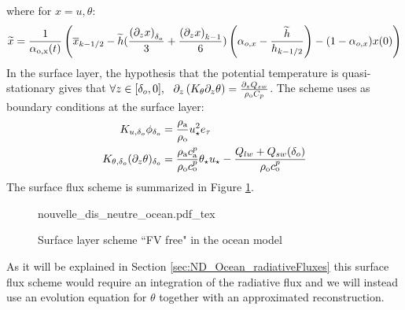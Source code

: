where for $x=u,\theta$:
\begin{equation}
	\widetilde{x} = \frac{1}{\alpha_{\rm o, x}(t)}
	\left(
	\overline{x}_{k-1/2} -
	\widetilde{h}(\frac{{(\partial_z x)}_{\delta_o}}{3} +
	\frac{{(\partial_z x)}_{k-1}}{6})
	\left(\alpha_{o, x}-\frac{\widetilde{h}}{h_{k-1/2}}\right)
	 - (1 - \alpha_{o, x})x(0)
	\right)
\end{equation}
In the surface layer, the hypothesis that the potential
temperature is quasi-stationary gives that
$\forall z \in [\delta_o, 0], ~~
\partial_z \left(K_\theta \partial_z \theta \right)
= \frac{\partial_z Q_{sw}}{\rho_{\rm o} C_p}$.
The scheme uses as boundary conditions at the surface layer:
\begin{equation}
\label{eq:ND_Ocean_boundaryConditionFVfree}
\begin{aligned}
	K_{u,\delta_o} \phi_{\delta_o} &= \frac{\rho_{\rm a}}
	{\rho_{\rm o}}
	u_\star^2 e_\tau
	\\
	K_{\theta, \delta_o} (\partial_z \theta)_{\delta_o} &= 
	\frac{\rho_{\rm a} c_{\rm a}^p}{\rho_{\rm o} c_{\rm o}^p}
	\theta_\star u_\star - \frac{Q_{lw} + Q_{sw}(\delta_{o})}{\rho_{\rm o} c_{\rm o}^p}
  \end{aligned}
\end{equation}
The surface flux scheme is summarized in Figure
\ref{fig:ND_Ocean_nouvelle_dis_neutre}.
\begin{figure}
	{nouvelle_dis_neutre_ocean.pdf_tex}
	\caption{Surface layer scheme ``FV free" in the ocean model}
	\label{fig:ND_Ocean_nouvelle_dis_neutre}
\end{figure}
As it will be explained
in Section \ref{sec:ND_Ocean_radiativeFluxes} this surface flux scheme
would require an integration of the radiative flux and we will instead
use an evolution equation for $\theta$ together with an approximated
reconstruction.
